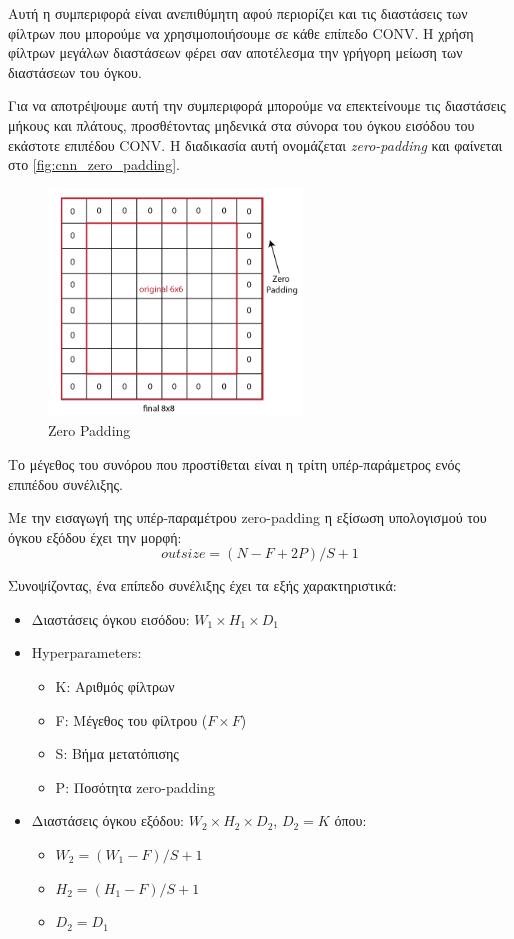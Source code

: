 Αυτή η συμπεριφορά είναι ανεπιθύμητη αφού περιορίζει και τις διαστάσεις των φίλτρων
που μπορούμε να χρησιμοποιήσουμε σε κάθε επίπεδο CONV. Η χρήση φίλτρων μεγάλων
διαστάσεων φέρει σαν αποτέλεσμα την γρήγορη μείωση των διαστάσεων του όγκου.

Για να αποτρέψουμε αυτή την συμπεριφορά μπορούμε να επεκτείνουμε τις διαστάσεις
μήκους και πλάτους, προσθέτοντας μηδενικά στα σύνορα του όγκου εισόδου του
εκάστοτε επιπέδου CONV. Η διαδικασία αυτή ονομάζεται
\emph{zero-padding} και φαίνεται στο \autoref{fig:cnn_zero_padding}.
\begin{figure}[!ht]
  \centering
  \includegraphics[width=0.6\textwidth]{./images/chapter3/cnn_zero_padding.png}
  \caption[Zero Padding]{Zero Padding}
  \label{fig:cnn_zero_padding}
\end{figure}
Το μέγεθος του συνόρου που προστίθεται είναι η τρίτη υπέρ-παράμετρος ενός
επιπέδου συνέλιξης.

Με την εισαγωγή της υπέρ-παραμέτρου zero-padding η εξίσωση υπολογισμού του όγκου
εξόδου έχει την μορφή:
\begin{equation*}
  outsize = (N - F + 2P)/S + 1
\end{equation*}

Συνοψίζοντας, ένα επίπεδο συνέλιξης έχει τα εξής χαρακτηριστικά:
\begin{itemize}
  \item{Διαστάσεις όγκου εισόδου: $W_{1} \times H_{1} \times D_{1}$}
  \item{Hyperparameters:}
    \begin{itemize}
      \item{K: Αριθμός φίλτρων}
      \item{F: Μέγεθος του φίλτρου ($F \times F$)}
      \item{S: Βήμα μετατόπισης}
      \item{P: Ποσότητα zero-padding}
    \end{itemize}
  \item{Διαστάσεις όγκου εξόδου: $W_{2} \times H_{2} \times D_{2}$, $D_{2} = K$} όπου:
    \begin{itemize}
      \item{$W_{2} = (W_{1} - F)/S + 1$}
      \item{$H_{2} = (H_{1} - F)/S + 1$}
      \item{$D_{2} = D_{1}$}
    \end{itemize}
\end{itemize}


